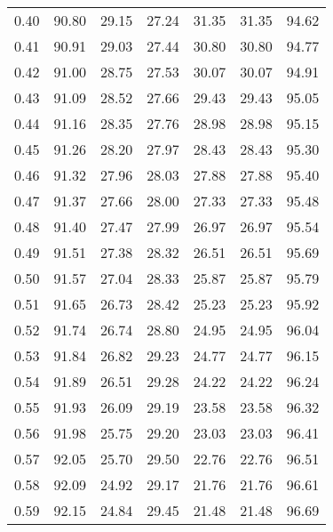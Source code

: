 \begin{tabular}{|c|c|c|c|c|c|c|}
      0.40 &     90.80 &     29.15 &      27.24 &   31.35 &      31.35 &         94.62 \\
      0.41 &     90.91 &     29.03 &      27.44 &   30.80 &      30.80 &         94.77 \\
      0.42 &     91.00 &     28.75 &      27.53 &   30.07 &      30.07 &         94.91 \\
      0.43 &     91.09 &     28.52 &      27.66 &   29.43 &      29.43 &         95.05 \\
      0.44 &     91.16 &     28.35 &      27.76 &   28.98 &      28.98 &         95.15 \\
      0.45 &     91.26 &     28.20 &      27.97 &   28.43 &      28.43 &         95.30 \\
      0.46 &     91.32 &     27.96 &      28.03 &   27.88 &      27.88 &         95.40 \\
      0.47 &     91.37 &     27.66 &      28.00 &   27.33 &      27.33 &         95.48 \\
      0.48 &     91.40 &     27.47 &      27.99 &   26.97 &      26.97 &         95.54 \\
      0.49 &     91.51 &     27.38 &      28.32 &   26.51 &      26.51 &         95.69 \\
      0.50 &     91.57 &     27.04 &      28.33 &   25.87 &      25.87 &         95.79 \\
      0.51 &     91.65 &     26.73 &      28.42 &   25.23 &      25.23 &         95.92 \\
      0.52 &     91.74 &     26.74 &      28.80 &   24.95 &      24.95 &         96.04 \\
      0.53 &     91.84 &     26.82 &      29.23 &   24.77 &      24.77 &         96.15 \\
      0.54 &     91.89 &     26.51 &      29.28 &   24.22 &      24.22 &         96.24 \\
      0.55 &     91.93 &     26.09 &      29.19 &   23.58 &      23.58 &         96.32 \\
      0.56 &     91.98 &     25.75 &      29.20 &   23.03 &      23.03 &         96.41 \\
      0.57 &     92.05 &     25.70 &      29.50 &   22.76 &      22.76 &         96.51 \\
      0.58 &     92.09 &     24.92 &      29.17 &   21.76 &      21.76 &         96.61 \\
      0.59 &     92.15 &     24.84 &      29.45 &   21.48 &      21.48 &         96.69 \\

\end{tabular}
